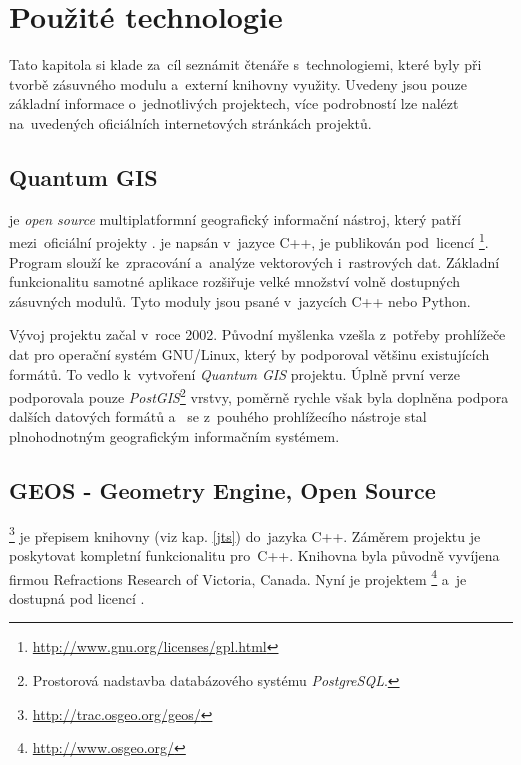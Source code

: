 \chapter{Použité technologie}
\label{4-technologie}

Tato kapitola si klade za~cíl seznámit čtenáře s~technologiemi, které byly 
při tvorbě zásuvného modulu a~externí knihovny využity. Uvedeny jsou pouze
základní informace o~jednotlivých projektech, více podrobností lze
nalézt na~uvedených oficiálních internetových stránkách projektů.


\section{Quantum GIS}
\label{qgis}

 je \textit{open source} multiplatformní geografický 
informační ná\-stroj, který patří mezi~oficiální projekty .
 je napsán v~jazyce C++, je pu\-blikován pod~licencí 
\footnote{\url{http://www.gnu.org/licenses/gpl.html}}. 
Program slouží ke~zpracování a~analýze vektorových i~rastrových dat. 
Základní funkcionalitu sa\-motné aplikace rozšiřuje velké množství 
volně dostupných zásuvných modulů. Tyto moduly jsou psané v~jazycích 
C++ nebo Python.

Vývoj projektu  začal v~roce 2002. Původní myšlenka vzešla 
z~potřeby prohlížeče  dat pro operační systém GNU/Linux, který 
by podporoval většinu existujících formátů. To vedlo k~vytvoření 
\textit{Quantum GIS} projektu. Úplně první verze podporovala pouze 
\textit{PostGIS}\footnote{Prostorová nadstavba databázového systému 
\textit{PostgreSQL}.} vrstvy, poměrně rychle však byla doplněna podpora 
dalších datových formátů a~ se z~pouhého prohlížecího nástroje 
stal plnohodnotným geografickým informačním systémem.


\section{GEOS - Geometry Engine, Open Source}
\label{geos}

\footnote{\url{http://trac.osgeo.org/geos/}}  je přepisem 
knihovny  (viz kap. \ref{jts}) do~jazyka C++. Záměrem 
projektu je poskytovat kompletní funkcionalitu  pro~C++. Knihovna 
byla původně vyvíjena firmou Refractions Research of Victoria, Canada. Nyní 
je projektem \footnote{\url{http://www.osgeo.org/}}  a~je 
dostupná pod licencí .

